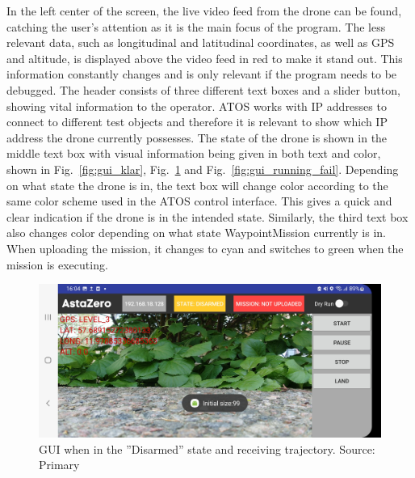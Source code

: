 In the left center of the screen, the live video feed from the drone can be found, catching the user's attention as it is the main focus of the program. The less relevant data, such as longitudinal and latitudinal coordinates, as well as GPS and altitude, is displayed above the video feed in red to make it stand out. This information constantly changes and is only relevant if the program needs to be debugged. The header consists of three different text boxes and a slider button, showing vital information to the operator. ATOS works with IP addresses to connect to different test objects and therefore it is relevant to show which IP address the drone currently possesses. The state of the drone is shown in the middle text box with visual information being given in both text and color, shown in Fig.~\ref{fig:gui_klar}, Fig.~\ref{fig:gui_disarmed_traj} and Fig.~\ref{fig:gui_running_fail}. Depending on what state the drone is in, the text box will change color according to the same color scheme used in the ATOS control interface. This gives a quick and clear indication if the drone is in the intended state. Similarly, the third text box also changes color depending on what state WaypointMission currently is  in. When uploading the mission, it changes to cyan and switches to green when the mission is executing. \newline
\begin{figure}[!h]
    \centering
    \includegraphics[width=1\textwidth]{figure/gui_disarmed_traj.jpg}
    \caption{GUI when in the ''Disarmed'' state and receiving trajectory. Source: Primary}
    \label{fig:gui_disarmed_traj}
\end{figure}

